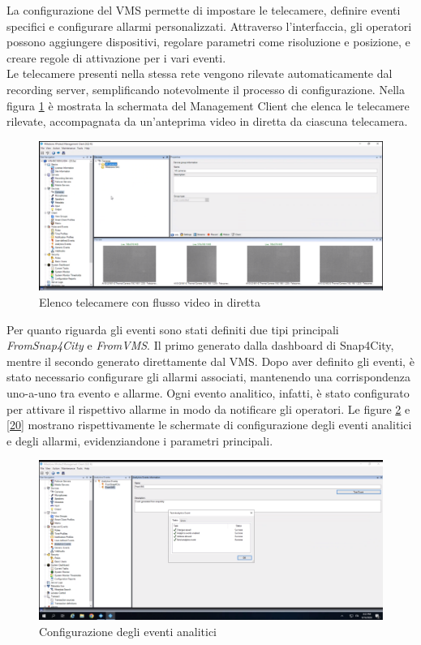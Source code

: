 \documentclass[a4paper, openright, thesis]{report}
\begin{document}
La configurazione del VMS permette di impostare le telecamere, definire eventi specifici e configurare allarmi personalizzati. Attraverso l'interfaccia, gli operatori possono aggiungere dispositivi, regolare parametri come risoluzione e posizione, e creare regole di attivazione per i vari eventi. \\
Le telecamere presenti nella stessa rete vengono rilevate automaticamente dal recording server, semplificando notevolmente il processo di configurazione. Nella figura \ref{18} è mostrata la schermata del Management Client che elenca le telecamere rilevate, accompagnata da un'anteprima video in diretta da ciascuna telecamera.
\begin{figure}[H]
    \centering
    \includegraphics[width=1\textwidth]{img/cam list.png}
    \caption{Elenco telecamere con flusso video in diretta}
    \label{18}
\end{figure}
\noindent
Per quanto riguarda gli eventi sono stati definiti due tipi principali \textit{FromSnap4City} e \textit{FromVMS}. Il primo generato dalla dashboard di Snap4City, mentre il secondo generato direttamente dal VMS. Dopo aver definito gli eventi, è stato necessario configurare gli allarmi associati, mantenendo una corrispondenza uno-a-uno tra evento e allarme. Ogni evento analitico, infatti, è stato configurato per attivare il rispettivo allarme in modo da notificare gli operatori. 
Le figure \ref{19} e \ref{20} mostrano rispettivamente le schermate di configurazione degli eventi analitici e degli allarmi, evidenziandone i parametri principali.
\begin{figure}[H]
    \centering
    \includegraphics[width=1\textwidth]{img/analytics_event.png}
    \caption{Configurazione degli eventi analitici}
    \label{19}
\end{figure}
\end{document}
